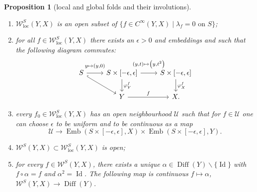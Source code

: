 \documentclass[pdftex]{sigma}
\numberwithin{equation}{section}
\newtheorem{Proposition}[Theorem]{Proposition}
\theoremstyle{definition}
\newcommand{\1}{{\bf 1}}
\newcommand{\Id}{\operatorname{Id}}
\newcommand{\loc}{\mathrm{loc}}
\DeclareMathOperator{\Diff}{Diff}
\begin{document}
\begin{Proposition}[local and global folds and their involutions] \
	\begin{enumerate}[label=\rm(\roman*)]\itemsep=0pt
		\item $\mathcal W_\loc^S(Y,X)$ is an open subset of $\{f\in C^\infty(Y,X)\mid \lambda_f = 0\text{ on } S\}$;
		
		\item for all $f\in \mathcal W_\loc^S(Y,X)$ there exists an $\epsilon>0$ and embeddings  and 
		such that the following diagram commutes:
		\[
		 	\begin{tikzcd}
		 		S \arrow["{y\mapsto (y,0)}"{yshift=1ex}]{r} \arrow[hookrightarrow]{rd} & S\times [-\epsilon,\epsilon] \arrow["{(y,t)\mapsto \bigl(y,t^2\bigr)}"{yshift=1ex}]{r} \arrow["{\varphi^f_Y}"]{d} & S\times [-\epsilon,\epsilon] \arrow["{\varphi^f_X}"]{d}\\
		 		& Y \arrow["{f}"]{r} & X.
		 	\end{tikzcd}
		\]
		\item every $f_0\in \mathcal W_\loc^S(Y,X)$ has an open neighbourhood $\mathcal U$ such that for $f\in \mathcal U$ one can choose $\epsilon$ to be uniform and  to be continuous as a map
		\[
		\mathcal U\to \operatorname{Emb}(S\times [-\epsilon,\epsilon],X) \times \operatorname{Emb}(S\times [-\epsilon,\epsilon],Y).
		\]
		\item $\mathcal W^S(Y,X)\subset \mathcal W^S_\loc(Y,X)$ is open;
		
		
		\item for every $f\in \mathcal W^S(Y,X)$, there exists a unique $\alpha \in \Diff(Y)\backslash \{\Id\}$ with $f\circ \alpha = f$ and $\alpha^2 = \Id$. The following map is continuous $f\mapsto \alpha$, $ \mathcal W^S(Y,X) \to \Diff(Y)$.
		
		
			\end{enumerate}
\end{Proposition}
\end{document}
